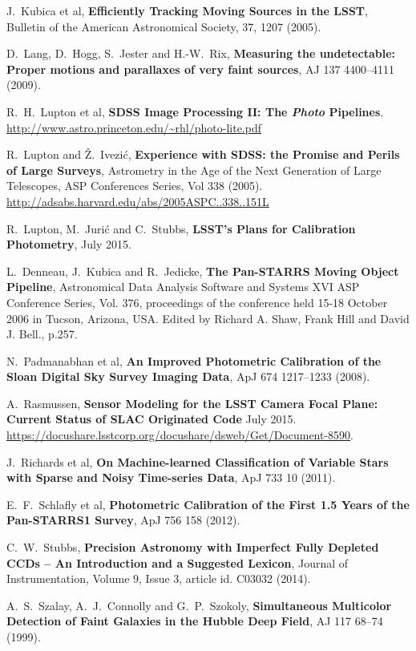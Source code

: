 \documentclass[12pt]{article}
\begin{document}
\begin{thebibliography}{10}
 J.~Kubica et al,
  \textbf{Efficiently Tracking Moving Sources in the LSST},
  Bulletin of the American Astronomical Society, 37, 1207 (2005).

 D.~Lang, D.~Hogg, S.~Jester and H.-W.~Rix,
  \textbf{Measuring the undetectable: Proper motions and parallaxes of very faint sources},
  AJ 137 4400--4111 (2009).

 R.~H.~Lupton et al,
  \textbf{SDSS Image Processing II: The \textit{Photo} Pipelines}.
  \url{http://www.astro.princeton.edu/~rhl/photo-lite.pdf}

 R.~Lupton and \v{Z}.~Ivezi\'c, \textbf{Experience with SDSS: the Promise and Perils of Large Surveys},
  Astrometry in the Age of the Next Generation of Large Telescopes, ASP
  Conferences Series, Vol 338 (2005). \url{http://adsabs.harvard.edu/abs/2005ASPC..338..151L}

 R.~Lupton, M.~Juri\'c and C.~Stubbs,
  \textbf{LSST's Plans for Calibration Photometry},
  July 2015.

 L.~Denneau, J.~Kubica and R.~Jedicke,
   \textbf{The Pan-STARRS Moving Object Pipeline}, Astronomical Data
  Analysis Software and Systems XVI ASP Conference Series, Vol. 376,
  proceedings of the conference held 15-18 October 2006 in Tucson,
  Arizona, USA\@. Edited by Richard A. Shaw, Frank Hill and David
  J. Bell., p.257.

 N.~Padmanabhan et al,
  \textbf{An Improved Photometric Calibration of the Sloan Digital Sky Survey Imaging Data},
  ApJ 674 1217--1233 (2008).

 A.~Rasmussen,
  \textbf{Sensor Modeling for the LSST Camera Focal Plane: Current Status of SLAC Originated Code}
  July 2015. \url{https://docushare.lsstcorp.org/docushare/dsweb/Get/Document-8590}.

 J.~Richards et al,
  \textbf{On Machine-learned Classification of Variable Stars with Sparse and Noisy Time-series Data},
  ApJ 733 10 (2011).

 E.~F.~Schlafly et al,
  \textbf{Photometric Calibration of the First 1.5 Years of the Pan-STARRS1 Survey},
  ApJ 756 158 (2012).

 C.~W.~Stubbs,
  \textbf{Precision Astronomy with Imperfect Fully Depleted CCDs -- An Introduction and a Suggested Lexicon},
  Journal of Instrumentation, Volume 9, Issue 3, article id. C03032 (2014).

 A.~S.~Szalay, A.~J.~Connolly and G.~P.~Szokoly,
  \textbf{Simultaneous Multicolor Detection of Faint Galaxies in the Hubble Deep Field},
  AJ 117 68--74 (1999).

\end{thebibliography}
\end{document}
